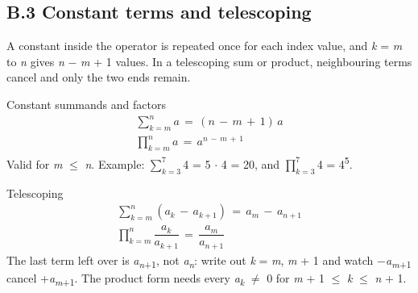 \documentclass[11pt]{article}
\begin{document}
\begin{keepsection}
\section{B.3 Constant terms and telescoping}

A constant inside the operator is repeated once for each index value, and \textit{k} = \textit{m} to \textit{n} gives \textit{n} \ensuremath{-} \textit{m} + 1 values. In a telescoping sum or product, neighbouring terms cancel and only the two ends remain.

\begin{equationcard}{Constant summands and factors}
\[ \begin{gathered} \sum_{{k}={m}}^{{n}} {a}\, =\, ({n}\, -\, {m}\, +\, 1)\, {a} \\ \prod_{{k}={m}}^{{n}} {a}\, =\, {a}^{{n}\, -\, {m}\, +\, 1} \end{gathered} \]
{\small Valid for \textit{m} \ensuremath{\leq} \textit{n}. Example: $\sum_{{k}=3}^{7} $4 = 5 \ensuremath{\cdot} 4 = 20, and $\prod_{{k}=3}^{7} $4 = 4\textsuperscript{5}.}
\end{equationcard}

\begin{equationcard}{Telescoping}
\[ \begin{gathered} \sum_{{k}={m}}^{{n}} ({a}_{{k}}\, -\, {a}_{{k}+1})\, =\, {a}_{{m}}\, -\, {a}_{{n}+1} \\ \prod_{{k}={m}}^{{n}} \dfrac{{a}_{{k}}}{{a}_{{k}+1}}\, =\, \dfrac{{a}_{{m}}}{{a}_{{n}+1}} \end{gathered} \]
{\small The last term left over is \textit{a}\textsubscript{\textit{n}+1}, not \textit{a}\textsubscript{\textit{n}}: write out \textit{k} = \textit{m}, \textit{m} + 1 and watch \ensuremath{-}\textit{a}\textsubscript{\textit{m}+1} cancel +\textit{a}\textsubscript{\textit{m}+1}. The product form needs every \textit{a}\textsubscript{\textit{k}} \ensuremath{\neq} 0 for \textit{m} + 1 \ensuremath{\leq} \textit{k} \ensuremath{\leq} \textit{n} + 1.}
\end{equationcard}
\end{keepsection}
\end{document}
